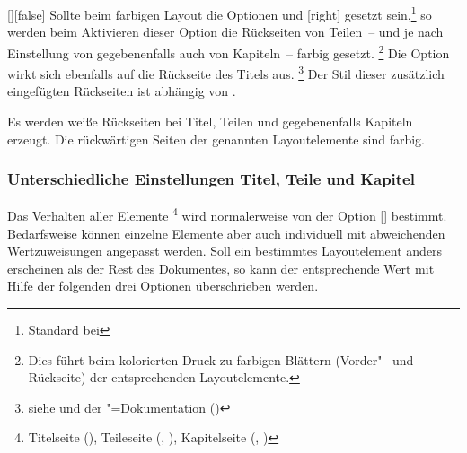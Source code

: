 \documentclass[%
  english,ngerman,%
  headings=optiontoheadandtoc,captions=tableheading,numbers=noenddot,%
  chapterpage,cdfoot,%
]{tudscrman}
\begin{document}
\begin{Declaration}{[\PBoolean]}[false]%
\printdeclarationlist%
%
%
%
%
  Sollte beim farbigen Layout die Optionen  und 
  [right] gesetzt sein,\footnote{Standard bei } 
  so werden beim Aktivieren dieser Option die Rückseiten von Teilen~-- und je 
  nach Einstellung von  gegebenenfalls auch von Kapiteln~-- 
  farbig gesetzt.%
  \footnote{%
    Dies führt beim kolorierten Druck zu farbigen Blättern (Vorder"~ und 
    Rückseite) der entsprechenden Layoutelemente.
  }
  Die Option wirkt sich ebenfalls auf die Rückseite des Titels aus.%
  \footnote{%
    siehe  und  der 
    \KOMAScript"=Dokumentation ()
  }
  Der Stil dieser zusätzlich eingefügten Rückseiten ist abhängig von 
  .
  \begin{values}
  \itemfalse
    Es werden weiße Rückseiten bei Titel, Teilen und gegebenenfalls Kapiteln 
    erzeugt.
  \itemtrue*
    Die rückwärtigen Seiten der genannten Layoutelemente sind farbig.
  \end{values}
\end{Declaration}

\subsubsection{Unterschiedliche Einstellungen Titel, Teile und Kapitel}
Das Verhalten aller Elemente%
\footnote{%
  Titelseite (), Teileseite (, ),
  Kapitelseite (, )%
}
wird normalerweise von der Option [\PSet] bestimmt. Bedarfsweise 
können einzelne Elemente aber auch individuell mit abweichenden Wertzuweisungen 
angepasst werden. Soll ein bestimmtes Layoutelement anders erscheinen als der 
Rest des Dokumentes, so kann der entsprechende Wert mit Hilfe der folgenden 
drei Optionen überschrieben werden.
\end{document}

